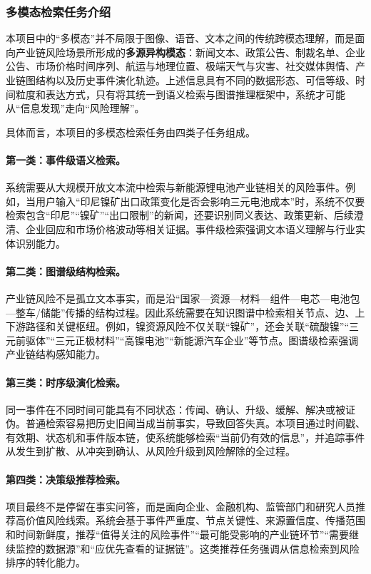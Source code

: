 ﻿\documentclass[12pt,a4paper]{article}
\newcommand{\term}[1]{\textbf{#1}}
\begin{document}
\subsubsection{多模态检索任务介绍}

本项目中的“多模态”并不局限于图像、语音、文本之间的传统跨模态理解，而是面向产业链风险场景所形成的\term{多源异构模态}：新闻文本、政策公告、制裁名单、企业公告、市场价格时间序列、航运与地理位置、极端天气与灾害、社交媒体舆情、产业链图结构以及历史事件演化轨迹。上述信息具有不同的数据形态、可信等级、时间粒度和表达方式，只有将其统一到语义检索与图谱推理框架中，系统才可能从“信息发现”走向“风险理解”。

具体而言，本项目的多模态检索任务由四类子任务组成。

\paragraph{第一类：事件级语义检索。}系统需要从大规模开放文本流中检索与新能源锂电池产业链相关的风险事件。例如，当用户输入“印尼镍矿出口政策变化是否会影响三元电池成本”时，系统不仅要检索包含“印尼”“镍矿”“出口限制”的新闻，还要识别同义表达、政策更新、后续澄清、企业回应和市场价格波动等相关证据。事件级检索强调文本语义理解与行业实体识别能力。

\paragraph{第二类：图谱级结构检索。}产业链风险不是孤立文本事实，而是沿“国家—资源—材料—组件—电芯—电池包—整车/储能”传播的结构过程。因此系统需要在知识图谱中检索相关节点、边、上下游路径和关键枢纽。例如，镍资源风险不仅关联“镍矿”，还会关联“硫酸镍”“三元前驱体”“三元正极材料”“高镍电池”“新能源汽车企业”等节点。图谱级检索强调产业链结构感知能力。

\paragraph{第三类：时序级演化检索。}同一事件在不同时间可能具有不同状态：传闻、确认、升级、缓解、解决或被证伪。普通检索容易把历史旧闻当成当前事实，导致回答失真。本项目通过时间戳、有效期、状态机和事件版本链，使系统能够检索“当前仍有效的信息”，并追踪事件从发生到扩散、从冲突到确认、从风险升级到风险解除的全过程。

\paragraph{第四类：决策级推荐检索。}项目最终不是停留在事实问答，而是面向企业、金融机构、监管部门和研究人员推荐高价值风险线索。系统会基于事件严重度、节点关键性、来源置信度、传播范围和时间新鲜度，推荐“值得关注的风险事件”“最可能受影响的产业链环节”“需要继续监控的数据源”和“应优先查看的证据链”。这类推荐任务强调从信息检索到风险排序的转化能力。
\end{document}
